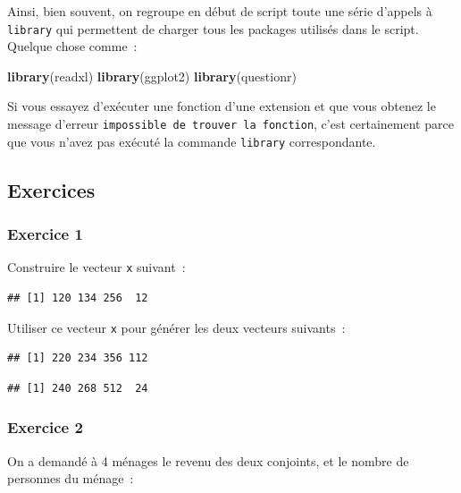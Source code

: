 \documentclass[
  12pt,
]{book}
\newenvironment{Shaded}{\begin{snugshade}}{\end{snugshade}}
\newcommand{\KeywordTok}[1]{\textcolor[rgb]{0.13,0.29,0.53}{\textbf{#1}}}
\newcommand{\NormalTok}[1]{#1}
\begin{document}
Ainsi, bien souvent, on regroupe en début de script toute une série d'appels à \texttt{library} qui permettent de charger tous les packages utilisés dans le script. Quelque chose comme~:

\begin{Shaded}
\begin{Highlighting}[]
\KeywordTok{library}\NormalTok{(readxl)}
\KeywordTok{library}\NormalTok{(ggplot2)}
\KeywordTok{library}\NormalTok{(questionr)}
\end{Highlighting}
\end{Shaded}

Si vous essayez d'exécuter une fonction d'une extension et que vous obtenez le message d'erreur \texttt{impossible\ de\ trouver\ la\ fonction}, c'est certainement parce que vous n'avez pas exécuté la commande \texttt{library} correspondante.

\hypertarget{ex-introR}{%
\subsection{Exercices}\label{ex-introR}}

\hypertarget{exercice-1}{%
\subsubsection{Exercice 1}\label{exercice-1}}

Construire le vecteur \texttt{x} suivant~:

\begin{verbatim}
## [1] 120 134 256  12
\end{verbatim}

Utiliser ce vecteur \texttt{x} pour générer les deux vecteurs suivants~:

\begin{verbatim}
## [1] 220 234 356 112
\end{verbatim}

\begin{verbatim}
## [1] 240 268 512  24
\end{verbatim}

\hypertarget{exercice-2}{%
\subsubsection{Exercice 2}\label{exercice-2}}

On a demandé à 4 ménages le revenu des deux conjoints, et le nombre de personnes du ménage~:
\end{document}

